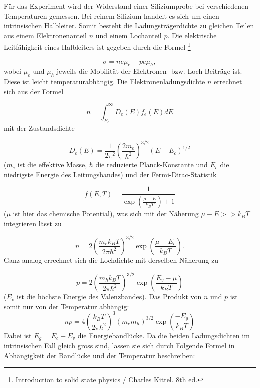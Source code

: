 \documentclass[a4paper,parskip,11pt, DIV12]{scrreprt}
\newcommand{\footnoteremember}[2]{
  \footnote{#2}
  \newcounter{#1}
  \setcounter{#1}{\value{footnote}}
}
\newcommand{\footnoterecall}[1]{%
  \footnotemark[\value{#1}]
}
\begin{document}
Für das Experiment wird der Widerstand einer Siliziumprobe bei verschiedenen Temperaturen gemessen. Bei reinem Silizium handelt es sich um einen intrinsischen Halbleiter. Somit besteht die Ladungsträgerdichte zu gleichen Teilen aus einem Elektronenanteil $n$ und einem Lochanteil $p$.
Die elektrische Leitfähigkeit eines Halbleiters ist gegeben durch die Formel\footnoteremember{kittel}{Introduction to solid state physics / Charles Kittel. 8th ed.}
\begin{equation}
\label{eq:sigma}
\sigma = ne\mu_e + pe\mu_h ,
\end{equation}
wobei $\mu_e$ und $\mu_h$ jeweils die Mobilität der Elektronen- bzw. Loch-Beiträge ist. Diese ist leicht temperaturabhängig. Die Elektronenladungsdichte $n$ errechnet sich aus der Formel\footnoterecall{kittel}
\begin{equation}
n = \int_{E_c}^{\infty} D_e(E) f_e(E) dE 
\end{equation}
mit der Zustandsdichte\footnoterecall{kittel}
\begin{equation}
D_e(E) = \frac{1}{2 \pi^2} \left(\frac{2 m_e}{\hbar^2}\right)^{3/2} (E - E_c)^{1/2}
\end{equation}
($m_e$ ist die effektive Masse, $\hbar$ die reduzierte Planck-Konstante und $E_c$ die niedrigste Energie des Leitungsbandes) und der Fermi-Dirac-Statistik\footnoterecall{kittel}
\begin{equation}
f(E,T) = \frac{1}{\exp \left(\frac{\mu - E}{k_B T}\right) + 1}
\end{equation}
($\mu$ ist hier das chemische Potential), was sich mit der Näherung $\mu - E >> k_B T$ integrieren lässt zu\footnoterecall{kittel}
\begin{equation}
n = 2 \left(\frac{m_e k_B T}{2 \pi \hbar^2}\right)^{3/2} \exp \left(\frac{\mu - E_c}{k_B T}\right).
\end{equation}
Ganz analog errechnet sich die Lochdichte mit derselben Näherung zu\footnoterecall{kittel}
\begin{equation}
p = 2 \left(\frac{m_h k_B T}{2 \pi \hbar^2}\right)^{3/2} \exp \left(\frac{E_v - \mu}{k_B T}\right)
\end{equation}
($E_v$ ist die höchste Energie des Valenzbandes). Das Produkt von $n$ und $p$ ist somit nur von der Temperatur abhängig:
\begin{equation}
np = 4 \left(\frac{k_B T}{2 \pi \hbar^2}\right)^{3} (m_e m_h)^{3/2} \exp \left(\frac{-E_g}{k_B T}\right)
\end{equation}
Dabei ist $E_g = E_c - E_v$ die Energiebandlücke. Da die beiden Ladungsdichten im intrinsischen Fall gleich gross sind, lassen sie sich durch Folgende Formel in Abhängigkeit der Bandlücke und der Temperatur beschreiben:
\end{document}
